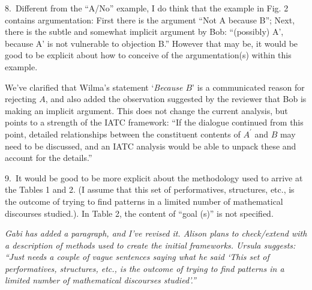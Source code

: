 

\begin{mdframed}[backgroundcolor=orange!10]
8.~Different from the ``A/No'' example, I do think that the example in Fig. 2 contains argumentation: First there is the argument ``Not A because B''; Next, there is the subtle and somewhat implicit argument by Bob: ``(possibly) A', because A' is not vulnerable to objection B.'' However that may be, it would be good to be explicit about how to conceive of the argumentation(s) within this example. 
\end{mdframed}

We've clarified that Wilma's statement `\emph{Because $B$}' is a communicated reason for rejecting $A$, and also added the observation suggested by the reviewer that Bob is making an implicit argument.  This does not change the current analysis, but points to a strength of the IATC framework: ``If the dialogue continued from this point, detailed relationships between the constituent contents of $A^\prime$ and $B$ may need to be discussed, and an IATC analysis would be able to unpack these and account for the details.''  

\begin{mdframed}[backgroundcolor=red!10]
9.~It would be good to be more explicit about the methodology used to arrive at the Tables 1 and 2. (I assume that this set of performatives, structures, etc., is the outcome of trying to find patterns in a limited number of mathematical discourses studied.). In Table 2, the content of ``goal (s)'' is not specified.
\end{mdframed}

\emph{Gabi has added a paragraph, and I've revised it. Alison plans to check/extend with a description of methods used to create the initial frameworks.  Ursula suggests: ``Just needs a couple of vague sentences saying what he said `This set of performatives, structures, etc., is the outcome of trying to find patterns in a limited number of mathematical discourses studied'.{''}}

